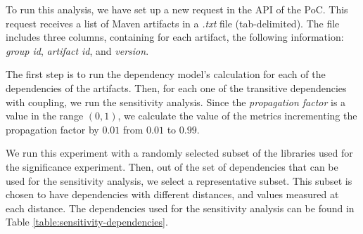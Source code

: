 To run this analysis, we have set up a new request in the API of the PoC. This request receives a list of Maven artifacts in a \textit{.txt} file (tab-delimited). The file includes three columns, containing for each artifact, the following information: \textit{group id}, \textit{artifact id}, and \textit{version}.

The first step is to run the dependency model's calculation for each of the dependencies of the artifacts. Then, for each one of the transitive dependencies with coupling, we run the sensitivity analysis. Since the \textit{propagation factor} is a value in the range $(0,1)$, we calculate the value of the metrics incrementing the propagation factor by $0.01$ from $0.01$ to $0.99$.

We run this experiment with a randomly selected subset of the libraries used for the significance experiment. Then, out of the set of dependencies that can be used for the sensitivity analysis, we select a representative subset. This subset is chosen to have dependencies with different distances, and values measured at each distance. The dependencies used for the sensitivity analysis can be found in Table \ref{table:sensitivity-dependencies}.

